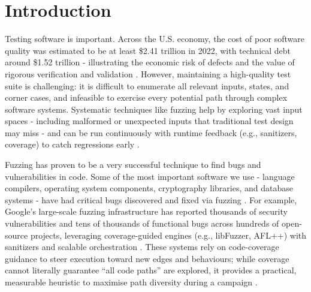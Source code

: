 \chapter{Introduction}
\label{sec:intro}



Testing software is important. Across the U.S. economy, the cost of poor software quality was estimated to be at least \$2.41 trillion in 2022, with technical debt around \$1.52 trillion - illustrating the economic risk of defects and the value of rigorous verification and validation \cite{globenewswire_2022_cisq,synopsysinc_2022_software}. However, maintaining a high-quality test suite is challenging: it is difficult to enumerate all relevant inputs, states, and corner cases, and infeasible to exercise every potential path through complex software systems. Systematic techniques like fuzzing help by exploring vast input spaces - including malformed or unexpected inputs that traditional test design may miss - and can be run continuously with runtime feedback (e.g., sanitizers, coverage) to catch regressions early \cite{mans_2021_the,yu_2024_fuzzing}.

Fuzzing has proven to be a very successful technique to find bugs and vulnerabilities in code. Some of the most important software we use - language compilers, operating system components, cryptography libraries, and database systems - have had critical bugs discovered and fixed via fuzzing \cite{mans_2021_the}. For example, Google's large-scale fuzzing infrastructure has reported thousands of security vulnerabilities and tens of thousands of functional bugs across hundreds of open-source projects, leveraging coverage-guided engines (e.g., libFuzzer, AFL++) with sanitizers and scalable orchestration \cite{googlesecurityblog_2023_aipowered}. These systems rely on code-coverage guidance to steer execution toward new edges and behaviours; while coverage cannot literally guarantee ``all code paths'' are explored, it provides a practical, measurable heuristic to maximise path diversity during a campaign \cite{googlesecurityblog_2023_aipowered,googlesecurityblog_2024_leveling}.

